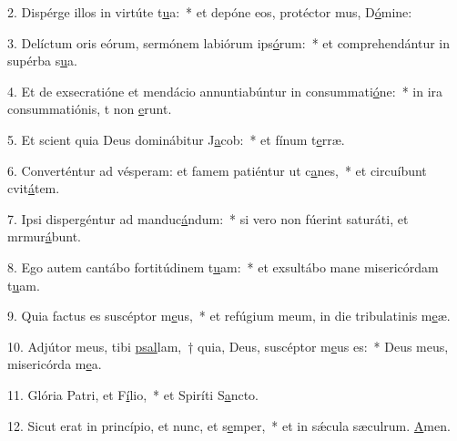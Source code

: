 2. Dispérge illos in virtúte t\uline{u}a:~* et depóne eos, protéctor mus, D\uline{ó}mine:\par 
3. Delíctum oris eórum, sermónem labiórum ips\uline{ó}rum:~* et comprehendántur in supérba s\uline{u}a.\par 
4. Et de exsecratióne et mendácio annuntiabúntur in consummati\uline{ó}ne:~* in ira consummatiónis, t non \uline{e}runt.\par 
5. Et scient quia Deus dominábitur J\uline{a}cob:~* et fínum t\uline{e}rræ.\par 
6. Converténtur ad vésperam: et famem patiéntur ut c\uline{a}nes,~* et circuíbunt cvit\uline{á}tem.\par 
7. Ipsi dispergéntur ad manduc\uline{á}ndum:~* si vero non fúerint saturáti, et mrmur\uline{á}bunt.\par 
8. Ego autem cantábo fortitúdinem t\uline{u}am:~* et exsultábo mane misericórdam t\uline{u}am.\par 
9. Quia factus es suscéptor m\uline{e}us,~* et refúgium meum, in die tribulatinis m\uline{e}æ.\par 
10. Adjútor meus, tibi \uline{psal}lam,~† quia, Deus, suscéptor m\uline{e}us es:~* Deus meus, misericórda m\uline{e}a.\par 
11. Glória Patri, et F\uline{í}lio,~* et Spiríti S\uline{a}ncto.\par 
12. Sicut erat in princípio, et nunc, et s\uline{e}mper,~* et in sǽcula sæculrum. \uline{A}men.\par 
